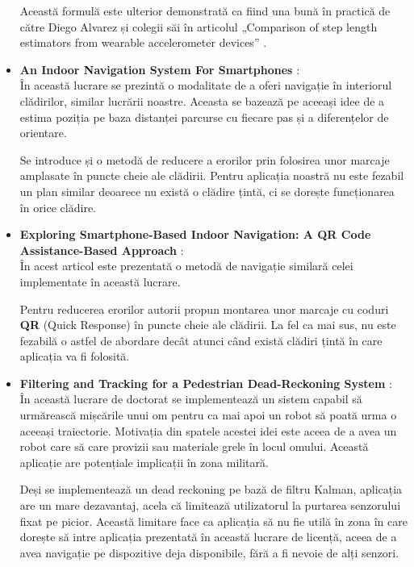\documentclass[12pt,a4paper]{article}
\begin{document}
\begin{itemize}
Această formulă este ulterior demonstrată ca fiind una bună în practică de către Diego Alvarez și colegii săi în articolul „Comparison of step length estimators from wearable accelerometer devices” \cite{StepLengthEstimatorsComparaison}.

\item \textbf{An Indoor Navigation System For Smartphones} \cite{AbhijitChandgadkar}:\\
În această lucrare se prezintă o modalitate de a oferi navigație în interiorul clădirilor, similar lucrării noastre. Aceasta se bazează pe aceeași idee de a estima poziția pe baza distanței parcurse cu fiecare pas și a diferențelor de orientare. 

Se introduce și o metodă de reducere a erorilor prin folosirea unor marcaje amplasate în puncte cheie ale clădirii. Pentru aplicația noastră nu este fezabil un plan similar deoarece nu există o clădire țintă, ci se dorește funcționarea în orice clădire.

\item \textbf{Exploring Smartphone-Based Indoor Navigation: A QR Code Assistance-Based Approach} \cite{QRNavigation}:\\
În acest articol este prezentată o metodă de navigație similară celei implementate în această lucrare. 

Pentru reducerea erorilor autorii propun montarea unor marcaje cu coduri \textbf{QR} (Quick Response) în puncte cheie ale clădirii. La fel ca mai sus, nu este fezabilă o astfel de abordare decât atunci când există clădiri țintă în care aplicația va fi folosită.

\item \textbf{Filtering and Tracking for a Pedestrian Dead-Reckoning System} \cite{SuratKwanmuang}:\\
În această lucrare de doctorat se implementează un sistem capabil să urmărească mișcările unui om pentru ca mai apoi un robot să poată urma o aceeași traiectorie. Motivația din spatele acestei idei este aceea de a avea un robot care să care provizii sau materiale grele în locul omului. Această aplicație are potențiale implicații în zona militară.

Deși se implementează un dead reckoning pe bază de filtru Kalman, aplicația are un mare dezavantaj, acela că limitează utilizatorul la purtarea senzorului fixat pe picior. Această limitare face ca aplicația să nu fie utilă în zona în care dorește să intre aplicația prezentată în această lucrare de licență, aceea de a avea navigație pe dispozitive deja disponibile, fără a fi nevoie de alți senzori.


\end{itemize}
\end{document}
